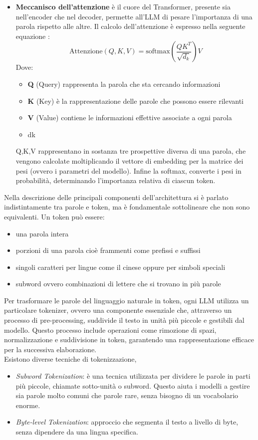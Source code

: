\documentclass{article}
\begin{document}
\begin{itemize}
\item \textbf{Meccanisco dell'attenzione} è il cuore del Transformer, presente sia nell'encoder che nel decoder, permette all'LLM di pesare l'importanza di una parola rispetto alle altre. Il calcolo dell'attenzione è espresso nella seguente equazione \cite{vaswani2017attention}:
\[
    \text{Attenzione}(Q, K, V) = \text{softmax}\left(\frac{QK^T}{\sqrt{d_k}}\right) V
\]
Dove:
\begin{itemize}
    \item \textbf{Q} (Query) rappresenta la parola che sta cercando informazioni
    \item \textbf{K} (Key) è la rappresentazione delle parole che possono essere rilevanti
    \item \textbf{V} (Value) contiene le informazioni effettive associate a ogni parola
    \item dk
\end{itemize}
Q,K,V rappresentano in sostanza tre prospettive diversa di una parola, che vengono calcolate moltiplicando il vettore di embedding per la matrice dei pesi (ovvero i parametri del modello). Infine la softmax,  converte i pesi in probabilità, determinando l'importanza relativa di ciascun token.
\end{itemize}
Nella descrizione delle principali componenti dell'architettura si è parlato indistintamente tra parole e token, ma è fondamentale sottolineare che non sono equivalenti. Un token può essere:
\begin{itemize}
    \item una parola intera
    \item porzioni di una parola cioè frammenti come prefissi e suffissi 
    \item singoli caratteri per lingue come il cinese oppure per simboli speciali
    \item subword ovvero combinazioni di lettere che si trovano in più parole
\end{itemize}
Per trasformare le parole del linguaggio naturale in token, ogni LLM utilizza un particolare tokenizer, ovvero una componente essenziale che, attraverso un processo di pre-processing, suddivide il testo in unità più piccole e gestibili dal modello. Questo processo include operazioni come rimozione di spazi, normalizzazione e suddivisione in token, garantendo una rappresentazione efficace per la successiva elaborazione.\\
Esistono diverse tecniche di tokenizzazione, 
\begin{itemize}
    \item \textit{Subword Tokenization}: è una tecnica utilizzata per dividere le parole in parti più piccole, chiamate sotto-unità o subword. Questo aiuta i modelli a gestire sia parole molto comuni che parole rare, senza bisogno di un vocabolario enorme.
    \item \textit{Byte-level Tokenization}: approccio che segmenta il testo a livello di byte, senza dipendere da una lingua specifica.
\end{itemize}
\end{document}
